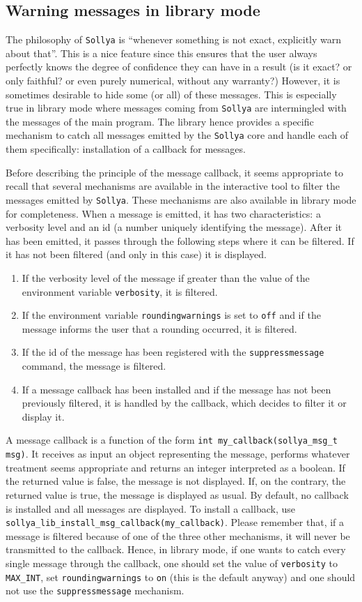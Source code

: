 \documentclass[a4paper]{article}
\newcommand{\sollya}{\texttt{Sollya}\xspace}
\begin{document}
\subsection{Warning messages in library mode}
\label{callbacks}
The philosophy of \sollya is ``whenever something is not exact, explicitly warn about that''. This is a nice feature since this ensures that the user always perfectly knows the degree of confidence they can have in a result (is it exact? or only faithful? or even purely numerical, without any warranty?) However, it is sometimes desirable to hide some (or all) of these messages. This is especially true in library mode where messages coming from \sollya are intermingled with the messages of the main program. The library hence provides a specific mechanism to catch all messages emitted by the \sollya core and handle each of them specifically: installation of a callback for messages.

Before describing the principle of the message callback, it seems appropriate to recall that several mechanisms are available in the interactive tool to filter the messages emitted by \sollya. These mechanisms are also available in library mode for completeness. When a message is emitted, it has two characteristics: a verbosity level and an id (a number uniquely identifying the message). After it has been emitted, it passes through the following steps where it can be filtered. If it has not been filtered (and only in this case) it is displayed.
\begin{enumerate}
\item If the verbosity level of the message if greater than the value of the environment variable \verb|verbosity|, it is filtered.
\item If the environment variable \verb|roundingwarnings| is set to \verb|off| and if the message informs the user that a rounding occurred, it is filtered.
\item If the id of the message has been registered with the \verb|suppressmessage| command, the message is filtered.
\item If a message callback has been installed and if the message has not been previously filtered, it is handled by the callback, which decides to filter it or display it.
\end{enumerate}

A message callback is a function of the form \verb|int my_callback(sollya_msg_t msg)|. It receives as input an object representing the message, performs whatever treatment seems appropriate and returns an integer interpreted as a boolean. If the returned value is false, the message is not displayed. If, on the contrary, the returned value is true, the message is displayed as usual. By default, no callback is installed and all messages are displayed. To install a callback, use \verb|sollya_lib_install_msg_callback(my_callback)|. Please remember that, if a message is filtered because of one of the three other mechanisms, it will never be transmitted to the callback. Hence, in library mode, if one wants to catch every single message through the callback, one should set the value of \verb|verbosity| to \verb|MAX_INT|, set \verb|roundingwarnings| to \verb|on| (this is the default anyway) and one should not use the \verb|suppressmessage| mechanism.
\end{document}
